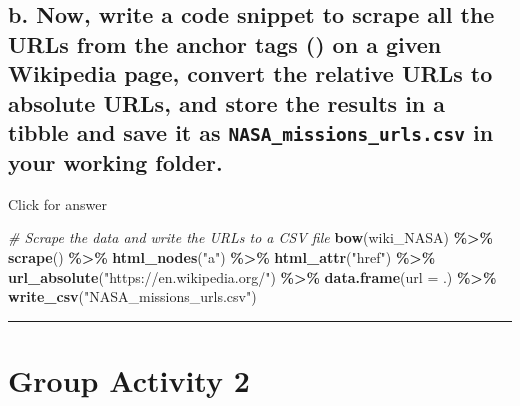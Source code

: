 \documentclass[
]{book}
\newenvironment{Shaded}{\begin{snugshade}}{\end{snugshade}}
\newcommand{\AttributeTok}[1]{\textcolor[rgb]{0.13,0.29,0.53}{#1}}
\newcommand{\CommentTok}[1]{\textcolor[rgb]{0.56,0.35,0.01}{\textit{#1}}}
\newcommand{\FunctionTok}[1]{\textcolor[rgb]{0.13,0.29,0.53}{\textbf{#1}}}
\newcommand{\NormalTok}[1]{#1}
\newcommand{\SpecialCharTok}[1]{\textcolor[rgb]{0.81,0.36,0.00}{\textbf{#1}}}
\newcommand{\StringTok}[1]{\textcolor[rgb]{0.31,0.60,0.02}{#1}}
\begin{document}
\hypertarget{b.-now-write-a-code-snippet-to-scrape-all-the-urls-from-the-anchor-tags-on-a-given-wikipedia-page-convert-the-relative-urls-to-absolute-urls-and-store-the-results-in-a-tibble-and-save-it-as-nasa_missions_urls.csv-in-your-working-folder.}{%
\subsection{\texorpdfstring{b. Now, write a code snippet to scrape all the URLs from the anchor tags () on a given Wikipedia page, convert the relative URLs to absolute URLs, and store the results in a tibble and save it as \texttt{NASA\_missions\_urls.csv} in your working folder.}{b. Now, write a code snippet to scrape all the URLs from the anchor tags () on a given Wikipedia page, convert the relative URLs to absolute URLs, and store the results in a tibble and save it as NASA\_missions\_urls.csv in your working folder.}}\label{b.-now-write-a-code-snippet-to-scrape-all-the-urls-from-the-anchor-tags-on-a-given-wikipedia-page-convert-the-relative-urls-to-absolute-urls-and-store-the-results-in-a-tibble-and-save-it-as-nasa_missions_urls.csv-in-your-working-folder.}}

Click for answer

\begin{Shaded}
\begin{Highlighting}[]
\CommentTok{\# Scrape the data and write the URLs to a CSV file}
\FunctionTok{bow}\NormalTok{(wiki\_NASA) }\SpecialCharTok{\%\textgreater{}\%} 
  \FunctionTok{scrape}\NormalTok{() }\SpecialCharTok{\%\textgreater{}\%} 
  \FunctionTok{html\_nodes}\NormalTok{(}\StringTok{"a"}\NormalTok{) }\SpecialCharTok{\%\textgreater{}\%}
  \FunctionTok{html\_attr}\NormalTok{(}\StringTok{"href"}\NormalTok{) }\SpecialCharTok{\%\textgreater{}\%} 
  \FunctionTok{url\_absolute}\NormalTok{(}\StringTok{"https://en.wikipedia.org/"}\NormalTok{) }\SpecialCharTok{\%\textgreater{}\%}
  \FunctionTok{data.frame}\NormalTok{(}\AttributeTok{url =}\NormalTok{ .) }\SpecialCharTok{\%\textgreater{}\%} 
  \FunctionTok{write\_csv}\NormalTok{(}\StringTok{"NASA\_missions\_urls.csv"}\NormalTok{) }
\end{Highlighting}
\end{Shaded}

\begin{center}\rule{0.5\linewidth}{0.5pt}\end{center}

\hypertarget{group-activity-2-3}{%
\section{Group Activity 2}\label{group-activity-2-3}}
\end{document}

